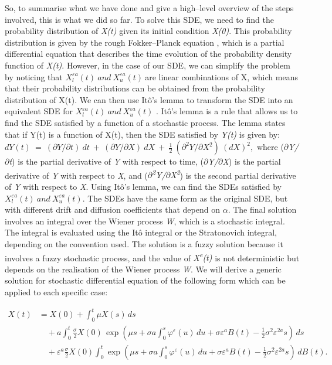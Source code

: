 \documentclass[12pt,a4paper]{report}
\numberwithin{equation}{section}
\begin{document}
So, to summarise what we have done and give a high--level overview of the
steps involved, this is what we did so far. To solve this SDE, we need
to find the probability distribution of \emph{X(t)} given its initial
condition \emph{X(0)}. This probability distribution is given by the
rough Fokker--Planck equation \cite{gatheral2014volatility_3}, which is a partial differential
equation that describes the time evolution of the probability density
function of \emph{X(t)}. However, in the case of our SDE, we can
simplify the problem by noticing that
\(X_{l}^{\varepsilon a}(t)\ and\ X_{u}^{\varepsilon a}(t)\ \)are linear
combinations of X, which means that their probability distributions can
be obtained from the probability distribution of X(t). We can then use
Itô's lemma to transform the SDE into an equivalent SDE for
\(X_{l}^{\varepsilon a}(t)\ and\ X_{u}^{\varepsilon a}(t)\) \cite{llendeto2007modeling_82}
\cite{jafari2021fuzzy_81}. Itô's lemma is a rule that allows us to find the SDE satisfied
by a function of a stochastic process. The lemma states that if Y(t) is
a function of X(t), then the SDE satisfied by \emph{Y(t)} is given by:
\(dY(t)\  = \ (\partial Y/\partial t)\ dt\  + \ (\partial Y/\partial X)\ dX\  + \ \frac{1}{2}\ (\partial^{2}Y/\partial X^{2})\ {(dX)}^{2},\)
where (\emph{$\partial$Y/$\partial$t}) is the partial derivative of \emph{Y} with respect
to time, (\emph{$\partial$Y/$\partial$X}) is the partial derivative of \emph{Y} with
respect to \emph{X}, and
(\emph{$\partial$\textsuperscript{2}Y/$\partial$X\textsuperscript{2}}) is the second
partial derivative of \emph{Y} with respect to \emph{X}. Using Itô's
lemma, we can find the SDEs satisfied by
\(X_{l}^{\varepsilon a}(t)\ and\ X_{u}^{\varepsilon a}(t)\). The SDEs
have the same form as the original SDE, but with different drift and
diffusion coefficients that depend on \emph{$\alpha$}. The final solution
involves an integral over the Wiener process \emph{W}, which is a
stochastic integral. The integral is evaluated using the Itô integral or
the Stratonovich integral, depending on the convention used. The
solution is a fuzzy solution because it involves a fuzzy stochastic
process, and the value of \emph{X\textsuperscript{e}(t)} is not
deterministic but depends on the realisation of the Wiener process
\emph{W}. We will derive a generic solution for stochastic differential
equation of the following form which can be applied to each specific
case:

\[
\begin{aligned}
X(t)
&= X(0) + \int_{0}^{t}\mu X(s)\,ds \\
&\quad + a\int_{0}^{t}\frac{\sigma}{2}X(0)\,
\exp\!\left(\mu s+\sigma a\int_{0}^{s}\varphi^{\varepsilon}(u)\,du+\sigma\varepsilon^{a}B(t)-\frac{1}{2}\sigma^{2}\varepsilon^{2a}s\right)\,ds \\
&\quad + \varepsilon^{a}\frac{\sigma}{2}X(0)\int_{0}^{t}
\exp\!\left(\mu s+\sigma a\int_{0}^{s}\varphi^{\varepsilon}(u)\,du+\sigma\varepsilon^{a}B(t)-\frac{1}{2}\sigma^{2}\varepsilon^{2a}s\right)\,dB(t).
\end{aligned}
\]
\end{document}
